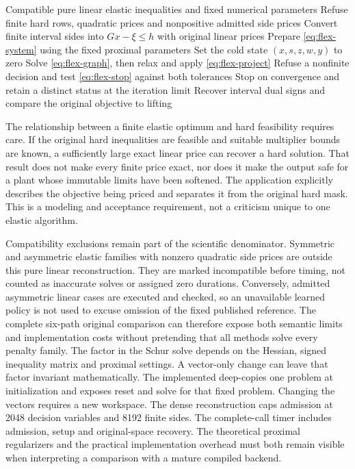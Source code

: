 \begin{algorithm}[htbp]
\caption{Execute the fixed FlexQP equations on an admitted pure linear elastic problem, preserving original prices and independently testing the returned original-space optimum.}\label{alg:flex}
\begin{algorithmic}[1]
\Require Compatible pure linear elastic inequalities and fixed numerical parameters
\State Refuse finite hard rows, quadratic prices and nonpositive admitted side prices
\State Convert finite interval sides into $Gx-\xi\leq h$ with original linear prices
\State Prepare \eqref{eq:flex-system} using the fixed proximal parameters
\State Set the cold state $(x,s,z,w,y)$ to zero
\State Solve \eqref{eq:flex-graph}, then relax and apply \eqref{eq:flex-project}
\State Refuse a nonfinite decision and test \eqref{eq:flex-stop} against both tolerances
\State Stop on convergence and retain a distinct status at the iteration limit
\EndWhile
\State Recover interval dual signs and compare the original objective to lifting
\end{algorithmic}
\end{algorithm}

The relationship between a finite elastic optimum and hard feasibility requires
care. If the original hard inequalities are feasible and suitable multiplier
bounds are known, a sufficiently large exact linear price can recover a hard
solution. That result does not make every finite price exact, nor does it make
the output safe for a plant whose immutable limits have been softened. The
application explicitly describes the objective being priced and separates it
from the original hard mask. This is a modeling and acceptance requirement,
not a criticism unique to one elastic algorithm.

Compatibility exclusions remain part of the scientific denominator. Symmetric
and asymmetric elastic families with nonzero quadratic side prices are outside
this pure linear reconstruction. They are marked incompatible before timing,
not counted as inaccurate solves or assigned zero durations. Conversely,
admitted asymmetric linear cases are executed and checked, so an
unavailable learned policy is not used to excuse omission of the fixed published
reference. The complete six-path original comparison can therefore expose
both semantic limits and implementation costs without pretending that all
methods solve every penalty family.
The factor in the Schur solve depends on the Hessian, signed inequality
matrix and proximal settings. A vector-only change can leave that factor
invariant mathematically. The implemented  deep-copies
one problem at initialization and exposes reset and solve for that fixed
problem. Changing the vectors requires a new workspace. The dense
reconstruction caps admission at 2048 decision variables and 8192
finite sides. The complete-call timer
includes admission, setup and original-space recovery. The theoretical proximal regularizers
and the practical implementation overhead must both remain visible when
interpreting a comparison with a mature compiled backend.
